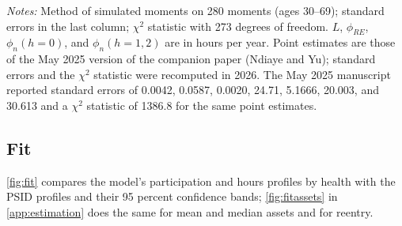 \begin{table}[!tp]
\centering
\caption{Estimated Preference Parameters}
\label{tab:est}
\vspace{6pt}
\footnotesize
\begin{threeparttable}

\begin{tablenotes}[flushleft]\scriptsize
\item[] \textit{Notes:} Method of simulated moments on 280 moments (ages 30--69); standard errors in the last column; $\chi^2$ statistic with 273 degrees of freedom. $L$, $\phi_{RE}$, $\phi_n(h{=}0)$, and $\phi_n(h{=}1,2)$ are in hours per year. Point estimates are those of the May 2025 version of the companion paper (Ndiaye and Yu); standard errors and the $\chi^2$ statistic were recomputed in 2026. The May 2025 manuscript reported standard errors of 0.0042, 0.0587, 0.0020, 24.71, 5.1666, 20.003, and 30.613 and a $\chi^2$ statistic of 1386.8 for the same point estimates.
\end{tablenotes}
\end{threeparttable}
\end{table}

\subsection{Fit}\label{subsec:fit}

\autoref{fig:fit} compares the model's participation and hours profiles by health with the PSID profiles and their 95 percent confidence bands; \autoref{fig:fitassets} in \autoref{app:estimation} does the same for mean and median assets and for reentry.

